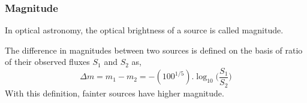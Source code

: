 %

\subsubsection{Magnitude}
In optical astronomy, the optical brightness of a source is called magnitude.

The difference in magnitudes between two sources is defined on the basis of ratio of their observed fluxes $ {S}_{1} $ and $ {S}_{2} $ as,
\begin{equation}
	\Delta {m}= {m}_{1}-{m}_{2}=-(100^{1/5}). \log_{10} \bigg(\frac{{S}_{1}}{{S}_{2}}\bigg)
\end{equation}
With this definition, fainter sources have higher magnitude.

